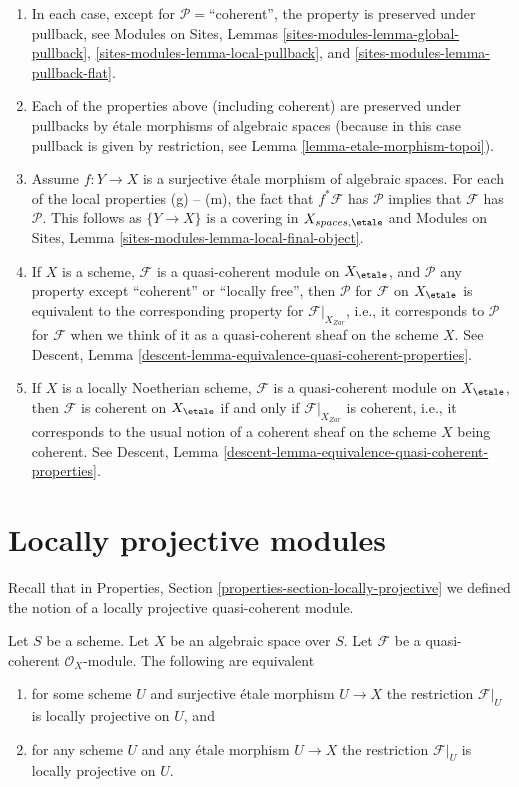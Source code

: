 \begin{enumerate}
\item In each case, except for $\mathcal{P}=$``coherent'', the property
is preserved under pullback, see
Modules on Sites, Lemmas \ref{sites-modules-lemma-global-pullback},
\ref{sites-modules-lemma-local-pullback}, and
\ref{sites-modules-lemma-pullback-flat}.
\item Each of the properties above (including coherent) are preserved under
pullbacks by \'etale morphisms of algebraic spaces (because in this
case pullback is given by restriction, see
Lemma \ref{lemma-etale-morphism-topoi}).
\item Assume $f : Y \to X$ is a surjective \'etale morphism of algebraic
spaces. For each of the local properties (g) -- (m), the fact that
$f^*\mathcal{F}$ has $\mathcal{P}$ implies that $\mathcal{F}$ has
$\mathcal{P}$. This follows as $\{Y \to X\}$ is a covering in
$X_{spaces, \etale}$ and
Modules on Sites, Lemma \ref{sites-modules-lemma-local-final-object}.
\item If $X$ is a scheme, $\mathcal{F}$ is a quasi-coherent module
on $X_\etale$, and $\mathcal{P}$ any property except ``coherent'' or
``locally free'', then $\mathcal{P}$ for $\mathcal{F}$ on $X_\etale$
is equivalent to the corresponding property for
$\mathcal{F}|_{X_{Zar}}$, i.e., it corresponds to $\mathcal{P}$
for $\mathcal{F}$ when we think of it as a quasi-coherent sheaf
on the scheme $X$. See
Descent, Lemma \ref{descent-lemma-equivalence-quasi-coherent-properties}.
\item If $X$ is a locally Noetherian scheme, $\mathcal{F}$ is a
quasi-coherent module on $X_\etale$, then $\mathcal{F}$
is coherent on $X_\etale$ if and only if
$\mathcal{F}|_{X_{Zar}}$ is coherent, i.e., it corresponds to
the usual notion of a coherent sheaf on the scheme $X$ being
coherent. See
Descent, Lemma \ref{descent-lemma-equivalence-quasi-coherent-properties}.
\end{enumerate}



\section{Locally projective modules}
\label{section-locally-projective}

\noindent
Recall that in
Properties, Section \ref{properties-section-locally-projective}
we defined the notion of a locally projective
quasi-coherent module.

\begin{lemma}
\label{lemma-locally-projective}
Let $S$ be a scheme. Let $X$ be an algebraic space over $S$.
Let $\mathcal{F}$ be a quasi-coherent $\mathcal{O}_X$-module.
The following are equivalent
\begin{enumerate}
\item for some scheme $U$ and surjective \'etale morphism
$U \to X$ the restriction $\mathcal{F}|_U$ is locally projective
on $U$, and
\item for any scheme $U$ and any \'etale morphism
$U \to X$ the restriction $\mathcal{F}|_U$ is locally projective
on $U$.
\end{enumerate}
\end{lemma}


